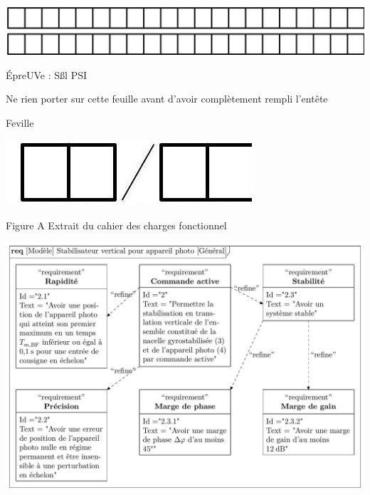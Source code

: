 \documentclass[10pt]{article}
\begin{document}
\begin{center}
\includegraphics[max width=\textwidth]{2022_12_31_ed674c1a831ea1bff3a0g-12(2)}
\end{center}

ÉpreUVe : Sßl PSI

Ne rien porter sur cette feuille avant d'avoir complètement rempli l'entête

Feville

\begin{center}
\includegraphics[max width=\textwidth]{2022_12_31_ed674c1a831ea1bff3a0g-12(3)}
\end{center}

Figure A Extrait du cahier des charges fonctionnel

\begin{center}
\includegraphics[max width=\textwidth]{2022_12_31_ed674c1a831ea1bff3a0g-13}
\end{center}
\end{document}
